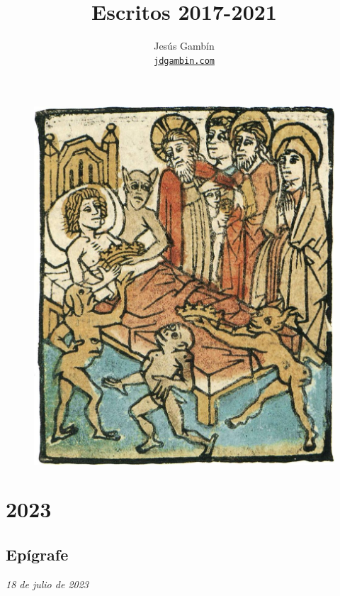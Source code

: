 \documentclass[12pt]{article}
\title
{
	Escritos 2017-2021\\\vspace{0.5cm}
}
\author
{
	Jesús Gambín\\
	\normalsize{
		\texttt{\href{https://jdgambin.github.io}{jdgambin.com}}
	}
	\\\vspace{-1cm}
}
\date{}
\begin{document}
	\maketitle

	\begin{figure}[ht]
		\centering
		\includegraphics[scale=1]{portada}
	\end{figure}

	\vspace{0.8cm}

	\newpage

	\tableofcontents

	\newpage

	\section{2023}

	\subsection{Epígrafe}

	\textit{18 de julio de 2023}\\
\end{document}
